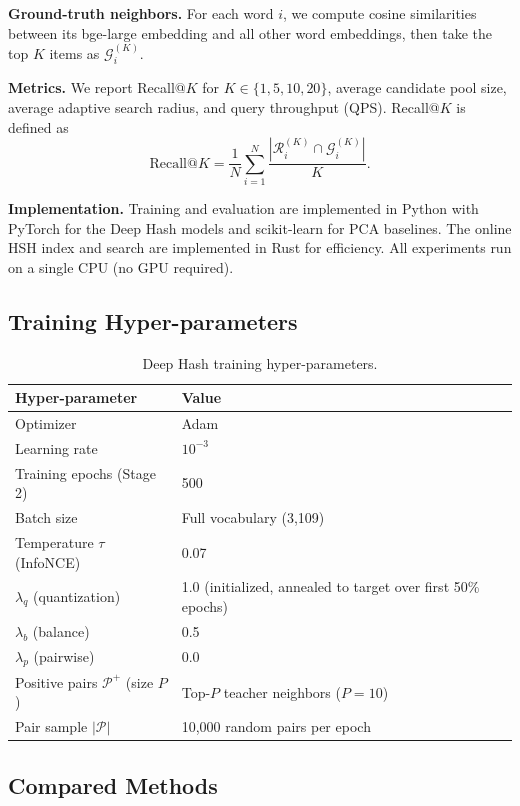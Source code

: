 \documentclass[11pt,a4paper]{article}
\begin{document}
\textbf{Ground-truth neighbors.} For each word $i$, we compute cosine similarities between its bge-large embedding and all other word embeddings, then take the top $K$ items as $\mathcal{G}_i^{(K)}$.

\textbf{Metrics.} We report Recall@$K$ for $K \in \{1, 5, 10, 20\}$, average candidate pool size, average adaptive search radius, and query throughput (QPS). Recall@$K$ is defined as
\begin{equation}
    \text{Recall@}K = \frac{1}{N} \sum_{i=1}^{N} \frac{| \mathcal{R}_i^{(K)} \cap \mathcal{G}_i^{(K)} |}{K}.
\end{equation}

\textbf{Implementation.} Training and evaluation are implemented in Python with PyTorch for the Deep Hash models and scikit-learn for PCA baselines. The online HSH index and search are implemented in Rust for efficiency. All experiments run on a single CPU (no GPU required).

\subsection{Training Hyper-parameters}

\begin{table}[htbp]
\centering
\caption{Deep Hash training hyper-parameters.}
\label{tab:hyperparams}
\begin{tabular}{ll}
\toprule
\textbf{Hyper-parameter} & \textbf{Value} \\
\midrule
Optimizer & Adam \\
Learning rate & $10^{-3}$ \\
Training epochs (Stage 2) & 500 \\
Batch size & Full vocabulary (3,109) \\
Temperature $\tau$ (InfoNCE) & 0.07 \\
$\lambda_q$ (quantization) & 1.0 (initialized, annealed to target over first 50\% epochs) \\
$\lambda_b$ (balance) & 0.5 \\
$\lambda_p$ (pairwise) & 0.0 \\
Positive pairs $\mathcal{P}^+$ (size $P$) & Top-$P$ teacher neighbors ($P=10$) \\
Pair sample $|\mathcal{P}|$ & 10,000 random pairs per epoch \\
\bottomrule
\end{tabular}
\end{table}

\subsection{Compared Methods}
\end{document}

